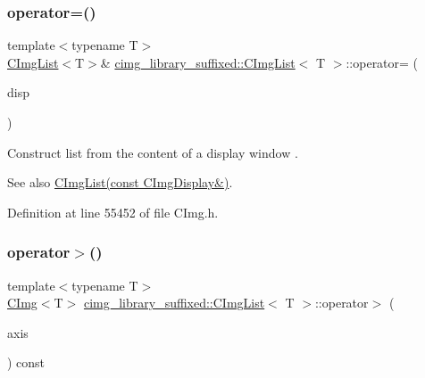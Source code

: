 \subsubsection{\texorpdfstring{operator=()}{operator=()}\hspace{0.1cm}{\footnotesize\ttfamily [4/4]}}
{\footnotesize\ttfamily template$<$typename T$>$ \\
\hyperlink{structcimg__library__suffixed_1_1CImgList}{C\+Img\+List}$<$T$>$\& \hyperlink{structcimg__library__suffixed_1_1CImgList}{cimg\+\_\+library\+\_\+suffixed\+::\+C\+Img\+List}$<$ T $>$\+::operator= (\begin{DoxyParamCaption}\item[{const \hyperlink{structcimg__library__suffixed_1_1CImgDisplay}{C\+Img\+Display} \&}]{disp }\end{DoxyParamCaption})\hspace{0.3cm}{\ttfamily [inline]}}



Construct list from the content of a display window . 

\begin{DoxySeeAlso}{See also}
\hyperlink{structcimg__library__suffixed_1_1CImgList_a32dbe3f9509eb41b2a18f4b68c737b39}{C\+Img\+List(const C\+Img\+Display\&)}. 
\end{DoxySeeAlso}


Definition at line 55452 of file C\+Img.\+h.

\mbox{\label{structcimg__library__suffixed_1_1CImgList_a0e99516c57bddf970731a26dee22ec64}} 
\subsubsection{\texorpdfstring{operator$>$()}{operator>()}}
{\footnotesize\ttfamily template$<$typename T$>$ \\
\hyperlink{structcimg__library__suffixed_1_1CImg}{C\+Img}$<$T$>$ \hyperlink{structcimg__library__suffixed_1_1CImgList}{cimg\+\_\+library\+\_\+suffixed\+::\+C\+Img\+List}$<$ T $>$\+::operator$>$ (\begin{DoxyParamCaption}\item[{const \hyperlink{classchar}{char}}]{axis }\end{DoxyParamCaption}) const\hspace{0.3cm}{\ttfamily [inline]}}




